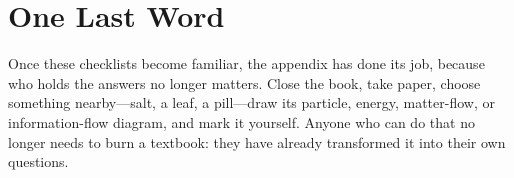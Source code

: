 \section*{One Last Word}

Once these checklists become familiar, the appendix has done its job, because who holds the answers no longer matters. Close the book, take paper, choose something nearby---salt, a leaf, a pill---draw its particle, energy, matter-flow, or information-flow diagram, and mark it yourself. Anyone who can do that no longer needs to burn a textbook: they have already transformed it into their own questions.
